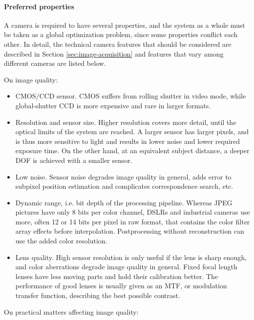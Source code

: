 \paragraph{Preferred properties}
A camera is required to have several properties, and the system as a whole must be taken as a global optimization problem, since some properties conflict each other.
In detail, the technical camera features that should be considered are described in Section \ref{sec:image-acquisition} and features that vary among different cameras are listed below.

On image quality:

\begin{itemize}
	\item CMOS/CCD sensor. CMOS suffers from rolling shutter in video mode, while global-shutter CCD is more expensive and rare in larger formats.

	\item Resolution and sensor size. Higher resolution covers more detail, until the optical limits of the system are reached. A larger sensor has larger pixels, and is thus more sensitive to light and results in lower noise and lower required exposure time. On the other hand, at an equivalent subject distance, a deeper DOF is achieved with a smaller sensor.

	\item Low noise. Sensor noise degrades image quality in general, adds error to subpixel position estimation and complicates correspondence search, etc.

	\item Dynamic range, i.e. bit depth of the processing pipeline. Whereas JPEG pictures have only 8 bits per color channel, DSLRs and industrial cameras use more, often 12 or 14 bits per pixel in raw format, that contains the color filter array effects before interpolation. Postprocessing without reconstruction can use the added color resolution.

	\item Lens quality. High sensor resolution is only useful if the lens is sharp enough, and color aberrations degrade image quality in general. Fixed focal length lenses have less moving parts and hold their calibration better. The performance of good lenses is usually given as an MTF, or modulation transfer function, describing the best possible contrast.
\end{itemize}

On practical matters affecting image quality:


